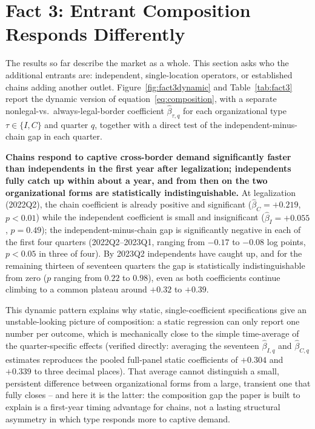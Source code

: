 \documentclass[english,12pt]{article}
\begin{document}
\FloatBarrier

\section{Fact 3: Entrant Composition Responds Differently}
\label{sec:composition}

The results so far describe the market as a whole. This section asks who the additional entrants are: independent, single-location operators, or established chains adding another outlet. Figure~\ref{fig:fact3dynamic} and Table~\ref{tab:fact3} report the dynamic version of equation~\eqref{eq:composition}, with a separate nonlegal-vs.\ always-legal-border coefficient $\hat\beta_{\tau,q}$ for each organizational type $\tau\in\{I,C\}$ and quarter $q$, together with a direct test of the independent-minus-chain gap in each quarter.

\textbf{Chains respond to captive cross-border demand significantly faster than independents in the first year after legalization; independents fully catch up within about a year, and from then on the two organizational forms are statistically indistinguishable.} At legalization (2022Q2), the chain coefficient is already positive and significant ($\hat\beta_C=+0.219$, $p<0.01$) while the independent coefficient is small and insignificant ($\hat\beta_I=+0.055$, $p=0.49$); the independent-minus-chain gap is significantly negative in each of the first four quarters (2022Q2--2023Q1, ranging from $-0.17$ to $-0.08$ log points, $p<0.05$ in three of four). By 2023Q2 independents have caught up, and for the remaining thirteen of seventeen quarters the gap is statistically indistinguishable from zero ($p$ ranging from $0.22$ to $0.98$), even as both coefficients continue climbing to a common plateau around $+0.32$ to $+0.39$.

This dynamic pattern explains why static, single-coefficient specifications give an unstable-looking picture of composition: a static regression can only report one number per outcome, which is mechanically close to the simple time-average of the quarter-specific effects (verified directly: averaging the seventeen $\hat\beta_{I,q}$ and $\hat\beta_{C,q}$ estimates reproduces the pooled full-panel static coefficients of $+0.304$ and $+0.339$ to three decimal places). That average cannot distinguish a small, persistent difference between organizational forms from a large, transient one that fully closes -- and here it is the latter: the composition gap the paper is built to explain is a first-year timing advantage for chains, not a lasting structural asymmetry in which type responds more to captive demand.
\end{document}
